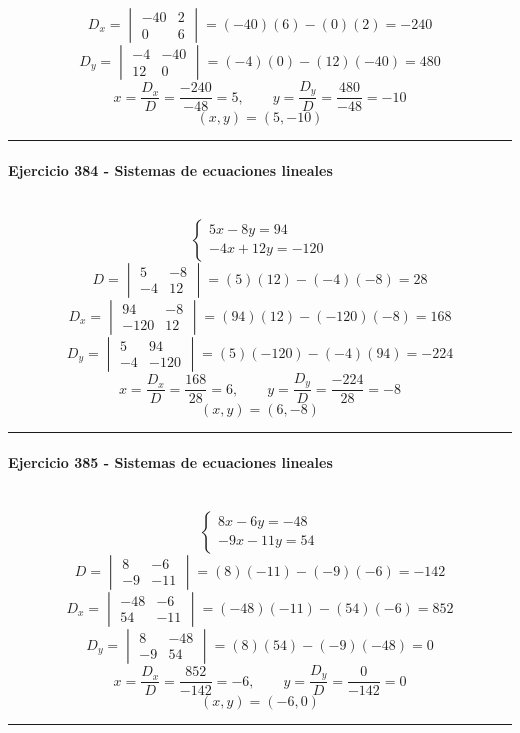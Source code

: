 \documentclass[10pt,a4paper]{article}
\newcommand{\res}[1]{\paragraph{#1}\mbox{}\\[-1.2em]}
\begin{document}
\[ D_x=\begin{vmatrix}-40&2\\0&6\end{vmatrix}=(-40)(6)-(0)(2)=-240 \]
\[ D_y=\begin{vmatrix}-4&-40\\12&0\end{vmatrix}=(-4)(0)-(12)(-40)=480 \]
\[ x=\frac{D_x}{D}=\frac{-240}{-48}=5,\qquad y=\frac{D_y}{D}=\frac{480}{-48}=-10 \]
\[ \boxed{(x,y)=(5,-10)} \]
\vspace{1mm}\hrule\vspace{2mm}
\res{Ejercicio 384 - Sistemas de ecuaciones lineales}
\[ \begin{cases}5 x - 8 y=94\\- 4 x + 12 y=-120\end{cases} \]
\[ D=\begin{vmatrix}5&-8\\-4&12\end{vmatrix}=(5)(12)-(-4)(-8)=28 \]
\[ D_x=\begin{vmatrix}94&-8\\-120&12\end{vmatrix}=(94)(12)-(-120)(-8)=168 \]
\[ D_y=\begin{vmatrix}5&94\\-4&-120\end{vmatrix}=(5)(-120)-(-4)(94)=-224 \]
\[ x=\frac{D_x}{D}=\frac{168}{28}=6,\qquad y=\frac{D_y}{D}=\frac{-224}{28}=-8 \]
\[ \boxed{(x,y)=(6,-8)} \]
\vspace{1mm}\hrule\vspace{2mm}
\res{Ejercicio 385 - Sistemas de ecuaciones lineales}
\[ \begin{cases}8 x - 6 y=-48\\- 9 x - 11 y=54\end{cases} \]
\[ D=\begin{vmatrix}8&-6\\-9&-11\end{vmatrix}=(8)(-11)-(-9)(-6)=-142 \]
\[ D_x=\begin{vmatrix}-48&-6\\54&-11\end{vmatrix}=(-48)(-11)-(54)(-6)=852 \]
\[ D_y=\begin{vmatrix}8&-48\\-9&54\end{vmatrix}=(8)(54)-(-9)(-48)=0 \]
\[ x=\frac{D_x}{D}=\frac{852}{-142}=-6,\qquad y=\frac{D_y}{D}=\frac{0}{-142}=0 \]
\[ \boxed{(x,y)=(-6,0)} \]
\vspace{1mm}\hrule\vspace{2mm}
\end{document}
